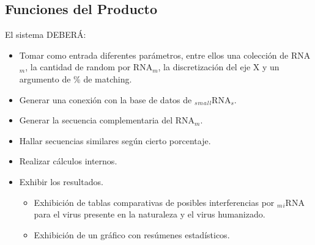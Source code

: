 \documentclass[12pt,a4paper,english,spanish]{article}
\begin{document}
\subsection{Funciones del Producto}
	El sistema DEBERÁ:
	\begin{itemize}
		\item Tomar como entrada diferentes parámetros, entre ellos una colección de RNA$_m$, la cantidad de random por RNA$_m$, la discretización del 				eje	X y un argumento de \% de matching.  

		\item Generar una conexión con la base de datos de $_s$$_m$$_a$$_l$$_l$RNA$_s$.
		\item Generar la secuencia complementaria del RNA$_m$.
		\item Hallar secuencias similares según cierto porcentaje.
		\item Realizar cálculos internos.
		\item Exhibir los resultados.
			\begin{itemize}
				\item Exhibición de tablas comparativas de posibles interferencias por $_m$$_i$RNA para el virus presente en la naturaleza y el virus 					humanizado.
				\item Exhibición de un gráfico con resúmenes estadísticos.
			\end{itemize}

	\end{itemize}
\end{document}
